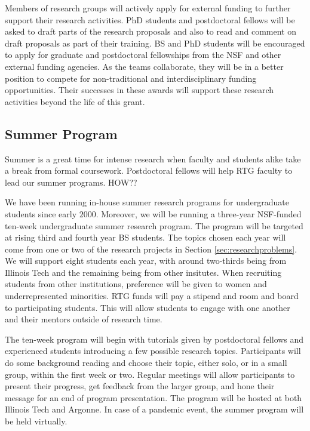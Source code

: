\documentclass[11pt]{NSFamsart}
\begin{document}
Members of research groups will actively apply for external funding to further support their research activities.  PhD students and postdoctoral fellows will be asked to draft parts of the research proposals and also to read and comment on draft proposals as part of their training.  BS and PhD students will be encouraged to apply for graduate and postdoctoral fellowships from the NSF and other external funding agencies.  As the teams collaborate, they will be in a better position to compete for  non-traditional and interdisciplinary funding opportunities.  Their successes in these awards will support these research activities beyond the life of this grant.



\subsection{Summer Program}    \label{sec:summer}

Summer is a great time for intense research when faculty and students alike take a break from formal coursework.  Postdoctoral fellows will help RTG faculty to lead our  summer programs. {\color{magenta}HOW??}  



We have been running in-house summer research programs for undergraduate students since early $2000$.  Moreover, we will be running a three-year NSF-funded ten-week undergraduate summer research program.  The program will be targeted at rising third and fourth year BS students.  The topics chosen each year will come from one or two of the research projects in Section \ref{sec:researchproblems}.  We will support eight students each year, with around two-thirds being from Illinois Tech and the remaining being from other insitutes.  When recruiting students from other institutions, preference will be given to women and underrepresented minorities.  RTG funds
will pay a stipend and room and board to participating students.  This will allow students to engage with one another and their mentors outside of research time.  

The ten-week program will begin with tutorials given by postdoctoral fellows and experienced students introducing a few possible research topics.  Participants will do some background reading and choose their topic, either solo, or in a small group, within the first week or two.  Regular meetings will allow participants to present their progress, get feedback from the larger group, and hone their message for an end of program presentation. The program will be hosted at both Illinois Tech and Argonne.  In case of a pandemic event, the summer program will be held virtually.
\end{document}
